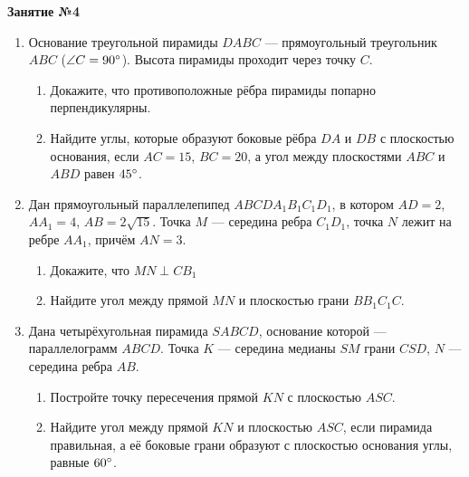 \documentclass[12pt, a4paper]{article}
\begin{document}
	
   \cfoot{}
\begin{center}
	\Large
	\textbf{Занятие №4}
\end{center}
\begin{enumerate}[label=\textbf{\arabic*.}]
	\item Основание треугольной пирамиды $DABC$ --- прямоугольный треугольник $ABC$ ($\angle C = 90\degree$). Высота пирамиды проходит через точку $C$.
	\begin{enumerate}[label=\asbuk*)]
		\item Докажите, что противоположные рёбра пирамиды попарно перпендикулярны.
		\item Найдите углы, которые образуют боковые рёбра $DA$ и $DB$ с плоскостью основания, если $AC = 15$, $BC = 20$, а угол между плоскостями $ABC$ и $ABD$ равен $45\degree$.
	\end{enumerate}
	\item Дан прямоугольный параллелепипед $ABCDA_1B_1C_1D_1$, в котором $AD=2$, $AA_1 =4$, $AB=2\sqrt{15}$. Точка $M$ --- середина ребра $C_1D_1$, точка $N$ лежит на ребре $AA_1$, причём $AN = 3$.
	\begin{enumerate}[label=\asbuk*)]
		\item Докажите, что $MN \perp CB_1$
		\item Найдите угол между прямой $MN$ и плоскостью грани $BB_1C_1C$.
	\end{enumerate}
	\item Дана четырёхугольная пирамида $SABCD$, основание которой --- параллелограмм $ABCD$. Точка $K$ --- середина медианы $SM$ грани $CSD$, $N$ --- середина ребра $AB$.
	\begin{enumerate}[label=\asbuk*)]
		\item Постройте точку пересечения прямой $KN$ с плоскостью $ASC$.
		\item Найдите угол между прямой $KN$ и плоскостью $ASC$, если пирамида правильная, а её боковые грани образуют с плоскостью основания углы, равные $60\degree$.
	\end{enumerate}
\end{enumerate}
\end{document}
